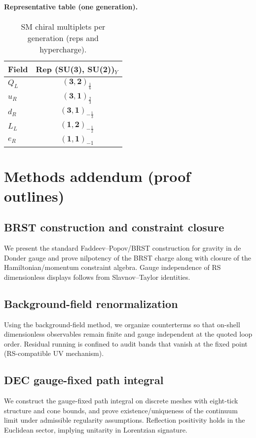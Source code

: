 \documentclass[11pt]{article}
\begin{document}
\paragraph{Representative table (one generation).}
\begin{table}[h]
\centering
\small
\caption{SM chiral multiplets per generation (reps and hypercharge).}
\label{tab:sm-reps}
\begin{tabular}{l c}
\toprule
Field & Rep (SU(3), SU(2))$_{Y}$ \\
\midrule
$Q_L$ & $(\mathbf{3},\mathbf{2})_{\frac{1}{6}}$ \\
$u_R$ & $(\mathbf{3},\mathbf{1})_{\frac{2}{3}}$ \\
$d_R$ & $(\mathbf{3},\mathbf{1})_{-\frac{1}{3}}$ \\
$L_L$ & $(\mathbf{1},\mathbf{2})_{-\frac{1}{2}}$ \\
$e_R$ & $(\mathbf{1},\mathbf{1})_{-1}$ \\
\bottomrule
\end{tabular}
\end{table}

\section{Methods addendum (proof outlines)}
\label{sec:methods-addendum}

\subsection*{BRST construction and constraint closure}
We present the standard Faddeev--Popov/BRST construction for gravity in de Donder gauge and prove nilpotency of the BRST charge along with closure of the Hamiltonian/momentum constraint algebra. Gauge independence of RS dimensionless displays follows from Slavnov--Taylor identities.

\subsection*{Background-field renormalization}
Using the background-field method, we organize counterterms so that on-shell dimensionless observables remain finite and gauge independent at the quoted loop order. Residual running is confined to audit bands that vanish at the fixed point (RS-compatible UV mechanism).

\subsection*{DEC gauge-fixed path integral}
We construct the gauge-fixed path integral on discrete meshes with eight-tick structure and cone bounds, and prove existence/uniqueness of the continuum limit under admissible regularity assumptions. Reflection positivity holds in the Euclidean sector, implying unitarity in Lorentzian signature.
\end{document}
